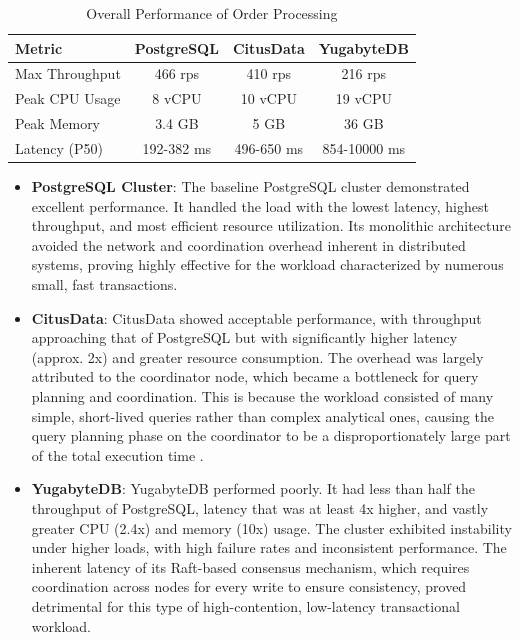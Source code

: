 \begin{table}[H]
    \caption{Overall Performance of Order Processing}
    \label{tab:perf_summary}
    \centering
    \begin{tabular}{|l|c|c|c|}
        \hline
        \textbf{Metric} & \textbf{PostgreSQL} & \textbf{CitusData} & \textbf{YugabyteDB} \\
        \hline
        Max Throughput  & 466 rps             & 410 rps            & 216 rps             \\
        \hline
        Peak CPU Usage  & 8 vCPU              & 10 vCPU            & 19 vCPU             \\
        \hline
        Peak Memory     & 3.4 GB              & 5 GB               & 36 GB               \\
        \hline
        Latency (P50)   & 192-382 ms          & 496-650 ms         & 854-10000 ms        \\
        \hline
    \end{tabular}
\end{table}

\begin{itemize}
    \item \textbf{PostgreSQL Cluster}: The baseline PostgreSQL cluster demonstrated excellent performance. It handled the load with the lowest latency, highest throughput, and most efficient resource utilization. Its monolithic architecture avoided the network and coordination overhead inherent in distributed systems, proving highly effective for the workload characterized by numerous small, fast transactions.

    \item \textbf{CitusData}: CitusData showed acceptable performance, with throughput approaching that of PostgreSQL but with significantly higher latency (approx. 2x) and greater resource consumption. The overhead was largely attributed to the coordinator node, which became a bottleneck for query planning and coordination. This is because the workload consisted of many simple, short-lived queries rather than complex analytical ones, causing the query planning phase on the coordinator to be a disproportionately large part of the total execution time \cite{Slot2020}.

    \item \textbf{YugabyteDB}: YugabyteDB performed poorly. It had less than half the throughput of PostgreSQL, latency that was at least 4x higher, and vastly greater CPU (2.4x) and memory (10x) usage. The cluster exhibited instability under higher loads, with high failure rates and inconsistent performance. The inherent latency of its Raft-based consensus mechanism, which requires coordination across nodes for every write to ensure consistency, proved detrimental for this type of high-contention, low-latency transactional workload.
\end{itemize}

